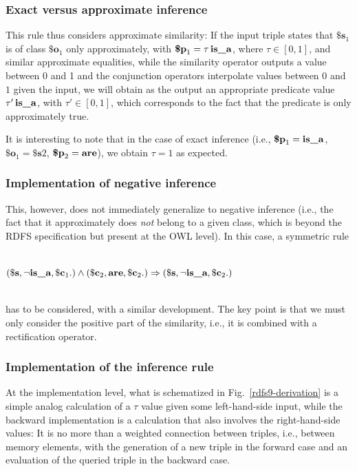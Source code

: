 \documentclass[sn-mathphys]{sn-jnl}
\newcommand{\eqline}[1]{~\vspace{0.1cm}\\\centerline{$#1$}\vspace{0.1cm}\\}
\begin{document}
\subsubsection{Exact versus approximate inference}

This rule thus considers approximate similarity: If the input triple states that $\textbf{\$s}_1$ is of class $\textbf{\$o}_1$ only approximately, with $\textbf{\$p}_1 = \tau \, \texttt{\bf is\_a}$, where $\tau \in [0,1]$, and similar approximate equalities, while the similarity operator outputs a value between 0 and 1 and the conjunction operators interpolate values between $0$ and $1$ given the input, we will obtain as the output an appropriate predicate value $\tau' \, \texttt{\bf is\_a}$, with $\tau' \in [0,1]$, which corresponds to the fact that the predicate is only approximately true.

It is interesting to note that in the case of exact inference (i.e., $\textbf{\$p}_1 = \texttt{\bf is\_a}$, $\textbf{\$o}_1 = \textbf{\$s}2$, $\textbf{\$p}_2 = \texttt{\bf are}$), we obtain $\tau = 1$ as expected.

\subsubsection{Implementation of negative inference}

This, however, does not immediately generalize to negative inference (i.e., the fact that it approximately does {\em not} belong to a given class, which is beyond the RDFS specification but present at the OWL level). In this case, a symmetric rule
\eqline{(\mathbf{\$s} ,  \neg \texttt{\bf is\_a} ,  \mathbf{\$c}_1 .) \wedge (\mathbf{\$c}_2 ,  \texttt{\bf are} ,  \mathbf{\$c}_2 .)  \Rightarrow (\mathbf{\$s} ,  \neg \texttt{\bf is\_a} ,  \mathbf{\$c}_2 .)}
has to be considered, with a similar development. The key point is that we must only consider the positive part of the similarity, i.e., it is combined with a rectification operator.

\subsubsection{Implementation of the inference rule}

At the implementation level, what is schematized in Fig.~\ref{rdfs9-derivation} is a simple analog calculation of a $\tau$ value given some left-hand-side input, while the backward implementation is a calculation that also involves the right-hand-side values: It is no more than a weighted connection between triples, i.e., between memory elements, with the generation of a new triple in the forward case and an evaluation of the queried triple in the backward case.
\end{document}
